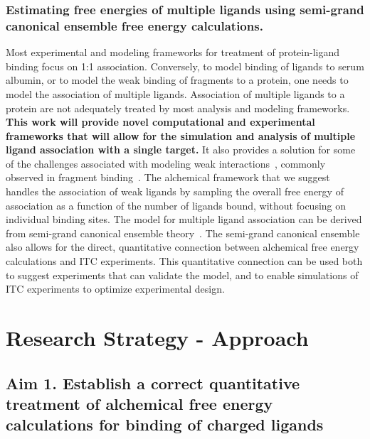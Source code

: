 \documentclass[10pt,final]{article}
\newif\ifinstr
\newcommand{\instr}[1]{\ifdraft{\ifinstr {\color{cyan}\emph{#1}} \fi}{}}
\begin{document}
\subsubsection*{Estimating free energies of multiple ligands using semi-grand canonical ensemble free energy calculations.}
Most experimental and modeling frameworks for treatment of protein-ligand binding focus on 1:1 association.
%
Conversely, to model binding of ligands to serum albumin, or to model the weak binding of fragments to a protein, one needs to model the association of multiple ligands.
%
Association of multiple ligands to a protein are not adequately treated by most analysis and modeling frameworks.
%
\textbf{This work will provide novel computational and experimental frameworks that will allow for the simulation and analysis of multiple ligand association with a single target.}
%
It also provides a solution for some of the challenges associated with modeling weak interactions~\autocite{Gilson1997a}, commonly observed in fragment binding~\autocite{Hajduk2007a}.
%
The alchemical framework that we suggest handles the association of weak ligands by sampling the overall free energy of association as a function of the number of ligands bound, without focusing on individual binding sites.
%
The model for multiple ligand association can be derived from semi-grand canonical ensemble theory~\autocite{Dill2010a}.
%
The semi-grand canonical ensemble also allows for the direct, quantitative connection between alchemical free energy calculations and ITC experiments.
%
This quantitative connection can be used both to suggest experiments that can validate the model, and to enable simulations of ITC experiments to optimize experimental design.

\section*{Research Strategy - Approach}
\instr{Approach: More specific background information. Describe in detail the experimental design and research methods to be used. Technical hurdles to be overcome should be mentioned. Alternative approaches should be given for experiments that may not be feasible. Discussion of expected or possible results and their interpretation. Best format for each specific aim: a) rationale, b) methods, c) expected results, d) alternatives. Theory aims should follow a similar structure where possible.}


\subsection*{Aim 1. Establish a correct quantitative treatment of alchemical free energy calculations for binding of charged ligands}
\end{document}
